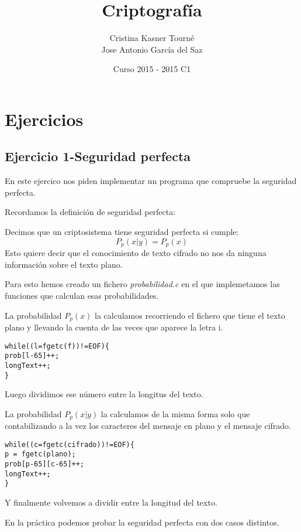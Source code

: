 \documentclass{apuntes}
\title{Criptografía}
\author{Cristina Kasner Tourné\\Jose Antonio García del Saz}
\date{Curso 2015 - 2015 C1}
\begin{document}
\pagestyle{plain}
\maketitle

\tableofcontents
\newpage
\appendix
\chapter{Ejercicios}
\section{Ejercicio 1-Seguridad perfecta}

En este ejercico nos piden implementar un programa que compruebe la seguridad perfecta.

Recordamos la definición de seguridad perfecta:

\begin{defn}
	Decimos que un criptosistema tiene seguridad perfecta si cumple:
	$$P_p(x|y) = P_p(x)$$
	Esto quiere decir que el conocimiento de texto cifrado no nos da ninguna información sobre el texto plano.
\end{defn}

Para esto hemos creado un fichero \textit{probabilidad.c} en el que implemetamos las funciones que calculan esas probabilidades.

La probabilidad $P_p(x)$ la calculamos recorriendo el fichero que tiene el texto plano y llevando la cuenta de las veces que aparece la letra i. 

\lstset{language=C, breaklines=true, basicstyle=\footnotesize}
\begin{lstlisting}
while((l=fgetc(f))!=EOF){
prob[l-65]++;
longText++;
}
\end{lstlisting}
Luego dividimos ese número entre la longitus del texto.

La probabilidad $P_p(x|y)$ la calculamos de la misma forma solo que contabilizando a la vez los caracteres del mensaje en plano y el mensaje cifrado.

\begin{lstlisting}
while((c=fgetc(cifrado))!=EOF){
p = fgetc(plano);
prob[p-65][c-65]++;
longText++;
}
\end{lstlisting}

Y finalmente volvemos a dividir entre la longitud del texto.

En la práctica podemos probar la seguridad perfecta con dos casos distintos.
\end{document}
